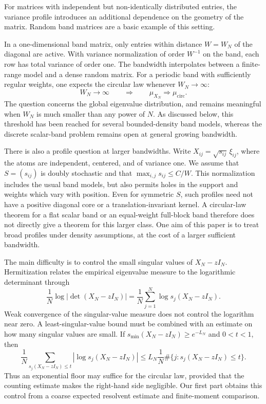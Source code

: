 \documentclass[11pt,reqno]{amsart}
\numberwithin{equation}{section}
\theoremstyle{plain}
\theoremstyle{definition}
\theoremstyle{remark}
\begin{document}
For matrices
with independent but non-identically distributed entries, the variance
profile introduces an additional dependence on the geometry of the
matrix. Random band matrices are a basic example of this setting.

In a one-dimensional band matrix, only entries within distance
$W=W_N$ of the diagonal are active. With variance normalization of order
$W^{-1}$ on the band, each row has total variance of order one.
The bandwidth interpolates between a finite-range model and a dense
random matrix. For a periodic band with sufficiently regular weights,
one expects the circular law whenever $W_N\to\infty$:
\[
 W_N\longrightarrow\infty
 \qquad\Longrightarrow\qquad
 \mu_{X_N}\Longrightarrow\mu_{\mathrm{circ}}.
\]
The question concerns the global eigenvalue distribution, and remains
meaningful when $W_N$ is much smaller than any power of $N$.
As discussed below, this threshold has been reached for several
bounded-density band models, whereas the discrete scalar-band problem
remains open at general growing bandwidth.

There is also a profile question at larger bandwidths. Write
$X_{ij}=\sqrt{s_{ij}}\,\xi_{ij}$, where the atoms are independent,
centered, and of variance one. We assume that $S=(s_{ij})$ is doubly
stochastic and that $\max_{i,j}s_{ij}\le C/W$. This normalization
includes the usual band models, but also permits holes in the support
and weights which vary with position. Even for symmetric $S$, such
profiles need not have a positive diagonal core or a translation-invariant
kernel. A circular-law theorem for a flat scalar band or an equal-weight
full-block band therefore does not directly give a theorem for this
larger class. One aim of this paper is to treat broad profiles under
density assumptions, at the cost of a larger sufficient bandwidth.

The main difficulty is to control the small singular values of
$X_N-zI_N$. Hermitization relates the empirical eigenvalue measure to
the logarithmic determinant through
\[
 \frac1N\log|\det(X_N-zI_N)|
 =\frac1N\sum_{j=1}^N\log s_j(X_N-zI_N).
\]
Weak convergence of the singular-value measure does not control the
logarithm near zero. A least-singular-value bound must be combined with
an estimate on how many singular values are small. If
$s_{\min}(X_N-zI_N)\ge e^{-L_N}$ and $0<t<1$, then
\[
 \frac1N\sum_{s_j(X_N-zI_N)\le t}|\log s_j(X_N-zI_N)|
 \le L_N\frac1N\#\{j:s_j(X_N-zI_N)\le t\}.
\]
Thus an exponential floor may suffice for the circular law, provided
that the counting estimate makes the right-hand side negligible.
Our first part obtains this control from a coarse expected resolvent
estimate and finite-moment comparison.
\end{document}
